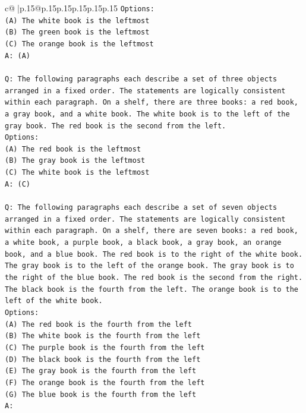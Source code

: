 \documentclass{article}
\begin{document}
{\begin{supertabular}{c@{$\;$}|p{.15\linewidth}@{}p{.15\linewidth}p{.15\linewidth}p{.15\linewidth}p{.15\linewidth}p{.15\linewidth}}
{{{\texttt{Options:} \\
\texttt{(A) The white book is the leftmost} \\
\texttt{(B) The green book is the leftmost} \\
\texttt{(C) The orange book is the leftmost} \\
\texttt{A: (A)} \\
\\ 
\texttt{Q: The following paragraphs each describe a set of three objects arranged in a fixed order. The statements are logically consistent within each paragraph. On a shelf, there are three books: a red book, a gray book, and a white book. The white book is to the left of the gray book. The red book is the second from the left.} \\
\texttt{Options:} \\
\texttt{(A) The red book is the leftmost} \\
\texttt{(B) The gray book is the leftmost} \\
\texttt{(C) The white book is the leftmost} \\
\texttt{A: (C)} \\
\\ 
\texttt{Q: The following paragraphs each describe a set of seven objects arranged in a fixed order. The statements are logically consistent within each paragraph. On a shelf, there are seven books: a red book, a white book, a purple book, a black book, a gray book, an orange book, and a blue book. The red book is to the right of the white book. The gray book is to the left of the orange book. The gray book is to the right of the blue book. The red book is the second from the right. The black book is the fourth from the left. The orange book is to the left of the white book.} \\
\texttt{Options:} \\
\texttt{(A) The red book is the fourth from the left} \\
\texttt{(B) The white book is the fourth from the left} \\
\texttt{(C) The purple book is the fourth from the left} \\
\texttt{(D) The black book is the fourth from the left} \\
\texttt{(E) The gray book is the fourth from the left} \\
\texttt{(F) The orange book is the fourth from the left} \\
\texttt{(G) The blue book is the fourth from the left} \\
\texttt{A:} \\
            }
        }
    }
     \\ \\


\end{supertabular}}
\end{document}
